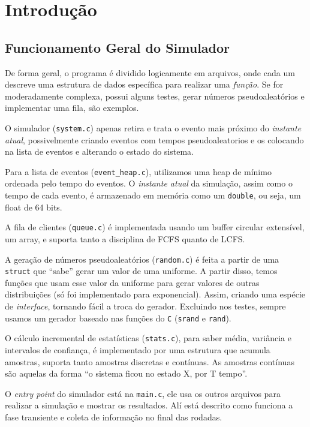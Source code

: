 \documentclass[a4paper]{article}
\newcommand{\arq}{\texttt}
\newcommand{\inlcode}{\texttt}
\newcommand{\lang}{\texttt}
\begin{document}
\section{Introdução}
\subsection{Funcionamento Geral do Simulador}
De forma geral,
o programa é dividido logicamente em arquivos,
onde cada um descreve uma estrutura de dados
específica para realizar uma \emph{função}.
Se for moderadamente complexa, possui alguns testes,
gerar números pseudoaleatórios e implementar uma fila,
são exemplos.

O simulador (\arq{system.c})
apenas retira e trata o evento mais próximo do \emph{instante atual},
possivelmente criando eventos com tempos pseudoaleatorios
e os colocando na lista de eventos e alterando o estado do sistema.

Para a lista de eventos (\arq{event\_heap.c}),
utilizamos uma heap de mínimo ordenada pelo tempo do eventos.
O \emph{instante atual} da simulação,
assim como o tempo de cada evento,
é armazenado em memória como um \inlcode{double}, ou seja,
um float de 64 bits.

A fila de clientes (\arq{queue.c})
é implementada usando um buffer circular extensível,
um array,
e suporta tanto a disciplina de FCFS quanto de LCFS.

A geração de números pseudoaleatórios (\arq{random.c})
é feita a partir de uma \inlcode{struct} que ``sabe''
gerar um valor de uma uniforme.
A partir disso, temos funções que usam esse valor da uniforme
para gerar valores de outras distribuições
(só foi implementado para exponencial).
Assim, criando uma espécie de \emph{interface},
tornando fácil a troca do gerador.
Excluindo nos testes, sempre usamos
um gerador baseado nas funções do \lang{C}
(\inlcode{srand} e \inlcode{rand}).

O cálculo incremental de estatísticas (\arq{stats.c}),
para saber média, variância e intervalos de confiança,
é implementado por uma estrutura que acumula amostras,
suporta tanto amostras discretas e contínuas.
As amostras contínuas são aquelas da forma
``o sistema ficou no estado X, por T tempo''.

O \emph{entry point} do simulador está na \arq{main.c},
ele usa os outros arquivos para realizar a simulação
e mostrar os resultados.
Alí está descrito como funciona a fase transiente e
coleta de informação no final das rodadas.
\end{document}
